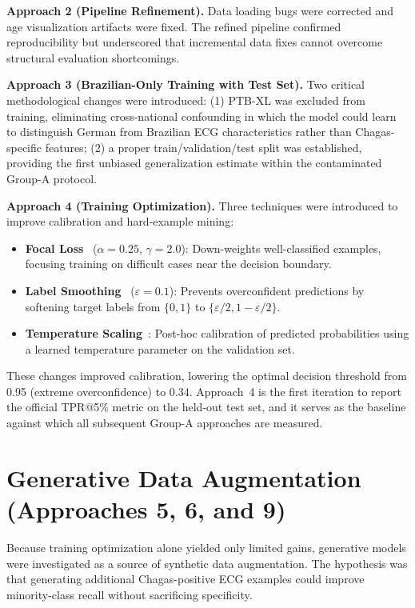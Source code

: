 \textbf{Approach 2 (Pipeline Refinement).} Data loading bugs were corrected and age visualization artifacts were fixed. The refined pipeline confirmed reproducibility but underscored that incremental data fixes cannot overcome structural evaluation shortcomings.

\textbf{Approach 3 (Brazilian-Only Training with Test Set).} Two critical methodological changes were introduced: (1) PTB-XL was excluded from training, eliminating cross-national confounding in which the model could learn to distinguish German from Brazilian ECG characteristics rather than Chagas-specific features; (2) a proper train/validation/test split was established, providing the first unbiased generalization estimate within the contaminated Group-A protocol.

\textbf{Approach 4 (Training Optimization).} Three techniques were introduced to improve calibration and hard-example mining:

\begin{itemize}
    \item \textbf{Focal Loss}~\cite{lin2017focal} ($\alpha = 0.25$, $\gamma = 2.0$): Down-weights well-classified examples, focusing training on difficult cases near the decision boundary.
    \item \textbf{Label Smoothing}~\cite{muller2019does} ($\varepsilon = 0.1$): Prevents overconfident predictions by softening target labels from $\{0, 1\}$ to $\{\varepsilon/2, 1 - \varepsilon/2\}$.
    \item \textbf{Temperature Scaling}~\cite{guo2017calibration}: Post-hoc calibration of predicted probabilities using a learned temperature parameter on the validation set.
\end{itemize}

These changes improved calibration, lowering the optimal decision threshold from 0.95 (extreme overconfidence) to 0.34. Approach~4 is the first iteration to report the official TPR@5\% metric on the held-out test set, and it serves as the baseline against which all subsequent Group-A approaches are measured.


\section{Generative Data Augmentation (Approaches 5, 6, and 9)}
\label{sec:generative}

Because training optimization alone yielded only limited gains, generative models were investigated as a source of synthetic data augmentation. The hypothesis was that generating additional Chagas-positive ECG examples could improve minority-class recall without sacrificing specificity.


